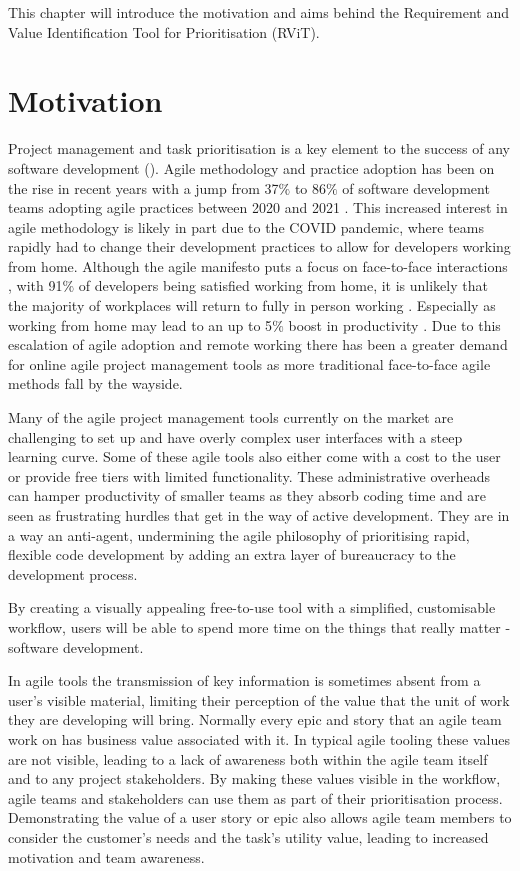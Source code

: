 \documentclass[l4proj.tex]{subfiles}
\begin{document}
  

This chapter will introduce the motivation and aims behind the Requirement and Value Identification Tool for Prioritisation (RViT).

\section{Motivation}

Project management and task prioritisation is a key element to the success of any software development (\cite{Verner2005}). Agile methodology and practice adoption has been on the rise in recent years with a jump from 37$\%$ to 86$\%$ of software development teams adopting agile practices between 2020 and 2021 \cite{Knaster2023}. This increased interest in agile methodology is likely in part due to the COVID pandemic, where teams rapidly had to change their development practices to allow for developers working from home.   Although the agile manifesto puts a focus on face-to-face interactions \cite{Kent2001}, with 91$\%$ of developers being satisfied working from home, it is unlikely that the majority of workplaces will return to fully in person working \cite{Ramírez2022}. Especially as working from home may lead to an up to 5$\%$ boost in productivity \cite{Barrero2021}. Due to this escalation of agile adoption and remote working there has been a greater demand for online agile project management tools as more traditional face-to-face agile methods fall by the wayside.

Many of the agile project management tools currently on the market are challenging to set up and have overly complex user interfaces with a steep learning curve. Some of these agile tools also either come with a cost to the user or provide free tiers with limited functionality. These administrative overheads can hamper productivity of smaller teams as they absorb coding time and are seen as frustrating hurdles that get in the way of active development. They are in a way an anti-agent, undermining the agile philosophy of prioritising rapid, flexible code development by adding an extra layer of bureaucracy to the development process.

By creating a visually appealing free-to-use tool with a simplified, customisable workflow, users will be able to spend more time on the things that really matter - software development.

In agile tools the transmission of key information is sometimes absent from a user's visible material, limiting their perception of the value that the unit of work they are developing will bring. Normally every epic and story that an agile team work on has business value associated with it. In typical agile tooling these values are not visible, leading to a lack of awareness both within the agile team itself and to any project stakeholders. By making these values visible in the workflow, agile teams and stakeholders can use them as part of their prioritisation process. Demonstrating the value of a user story or epic also allows agile team members to consider the customer's needs and the task's utility value, leading to increased motivation and team awareness.
\end{document}
